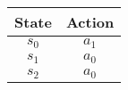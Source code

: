 \documentclass[varwidth=\maxdimen]{standalone}
\begin{document}
\pagestyle{empty}
\begin{table}[H]
  \centering
  \begin{tabular}{|c | c|}
    \hline
    State & Action \\
    \hline
    $s_0$ & $a_1$ \\
    \hline
    $s_1$ & $a_0$ \\
    \hline
    $s_2$ & $a_0$ \\
    \hline
  \end{tabular}
\end{table}
\end{document}
